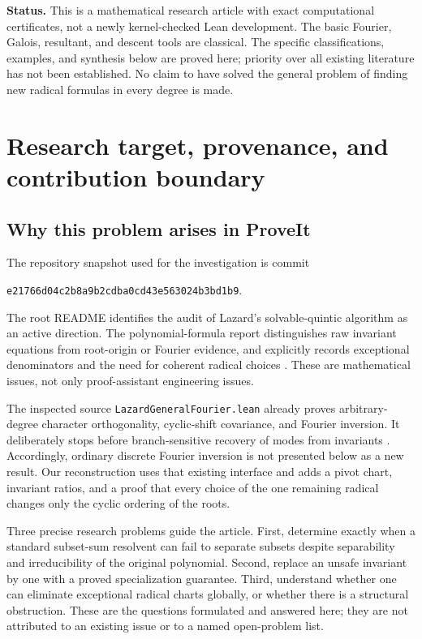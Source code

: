 \documentclass[11pt,a4paper]{article}
\theoremstyle{definition}
\theoremstyle{remark}
\newcommand{\code}[1]{{\small\nolinkurl{#1}}}
\newcommand{\snapshot}{\nolinkurl{e21766d04c2b8a9b2cdba0cd43e563024b3bd1b9}}
\begin{document}
\medskip
\noindent\textbf{Status.} This is a mathematical research article with exact
computational certificates, not a newly kernel-checked Lean development.
The basic Fourier, Galois, resultant, and descent tools are classical. The
specific classifications, examples, and synthesis below are proved here;
priority over all existing literature has not been established. No claim to
have solved the general problem of finding new radical formulas in every
degree is made.

\clearpage
\begingroup\small
\tableofcontents
\endgroup
\clearpage

\section{Research target, provenance, and contribution boundary}
\label{sec:boundary}

\subsection{Why this problem arises in ProveIt}

The repository snapshot used for the investigation is commit
\begin{center}\snapshot.\end{center}
The root README identifies the audit of Lazard's solvable-quintic algorithm
as an active direction. The polynomial-formula report distinguishes raw
invariant equations from root-origin or Fourier evidence, and explicitly
records exceptional denominators and the need for coherent radical choices
\cite{repoReadme,repoReport,repoCrosswalk}. These are mathematical issues, not
only proof-assistant engineering issues.

The inspected source \code{LazardGeneralFourier.lean} already proves
arbitrary-degree character orthogonality, cyclic-shift covariance, and
Fourier inversion. It deliberately stops before branch-sensitive recovery
of modes from invariants \cite{repoFourier}. Accordingly, ordinary discrete
Fourier inversion is not presented below as a new result. Our reconstruction
uses that existing interface and adds a pivot chart, invariant ratios,
and a proof that every choice of the one remaining radical changes only the
cyclic ordering of the roots.

Three precise research problems guide the article. First, determine exactly
when a standard subset-sum resolvent can fail to separate subsets despite
separability and irreducibility of the original polynomial. Second, replace
an unsafe invariant by one with a proved specialization guarantee. Third,
understand whether one can eliminate exceptional radical charts globally,
or whether there is a structural obstruction. These are the questions
formulated and answered here; they are not attributed to an existing issue
or to a named open-problem list.
\end{document}

